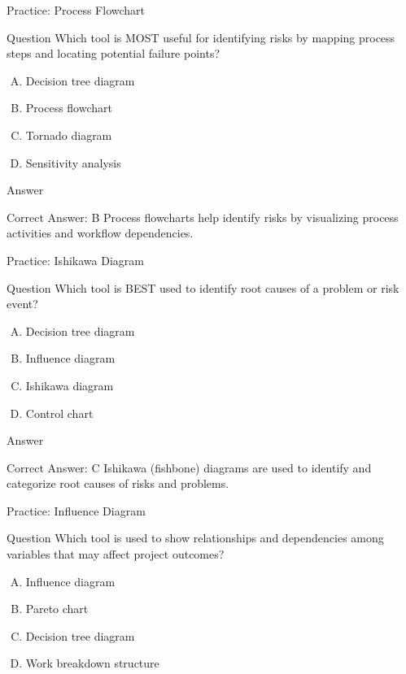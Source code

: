 \documentclass{beamer}
\begin{document}
	
	
	\begin{frame}{Practice: Process Flowchart}
		\begin{block}{Question}
			Which tool is MOST useful for identifying risks by mapping process steps and locating potential failure points?
		\end{block}
		\begin{enumerate}[(A)]
			\item Decision tree diagram
			\item Process flowchart
			\item Tornado diagram
			\item Sensitivity analysis
		\end{enumerate}
	\end{frame}
	
	\begin{frame}{Answer}
		\begin{block}{Correct Answer: B}
			Process flowcharts help identify risks by visualizing process activities and workflow dependencies.
		\end{block}
	\end{frame}
	
	\begin{frame}{Practice: Ishikawa Diagram}
		\begin{block}{Question}
			Which tool is BEST used to identify root causes of a problem or risk event?
		\end{block}
		\begin{enumerate}[(A)]
			\item Decision tree diagram
			\item Influence diagram
			\item Ishikawa diagram
			\item Control chart
		\end{enumerate}
	\end{frame}
	
	\begin{frame}{Answer}
		\begin{block}{Correct Answer: C}
			Ishikawa (fishbone) diagrams are used to identify and categorize root causes of risks and problems.
		\end{block}
	\end{frame}
	
	\begin{frame}{Practice: Influence Diagram}
		\begin{block}{Question}
			Which tool is used to show relationships and dependencies among variables that may affect project outcomes?
		\end{block}
		\begin{enumerate}[(A)]
			\item Influence diagram
			\item Pareto chart
			\item Decision tree diagram
			\item Work breakdown structure
		\end{enumerate}
	\end{frame}
	
\end{document}
